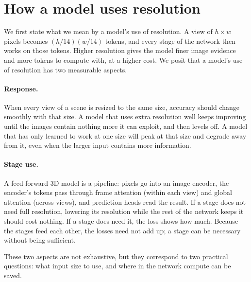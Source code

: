 \section{How a model uses resolution}
\label{sec:concept}

We first state what we mean by a model's use of resolution. A view of $h\times w$ pixels becomes $(h/14)(w/14)$ tokens, and every stage of the network then works on those tokens. Higher resolution gives the model finer image evidence and more tokens to compute with, at a higher cost. We posit that a model's use of resolution has two measurable aspects.

\paragraph{Response.} When every view of a scene is resized to the same size, accuracy should change smoothly with that size. A model that uses extra resolution well keeps improving until the images contain nothing more it can exploit, and then levels off. A model that has only learned to work at one size will peak at that size and degrade away from it, even when the larger input contains more information.

\paragraph{Stage use.} A feed-forward 3D model is a pipeline: pixels go into an image encoder, the encoder's tokens pass through frame attention (within each view) and global attention (across views), and prediction heads read the result. If a stage does not need full resolution, lowering its resolution while the rest of the network keeps it should cost nothing. If a stage does need it, the loss shows how much. Because the stages feed each other, the losses need not add up; a stage can be necessary without being sufficient.

These two aspects are not exhaustive, but they correspond to two practical questions: what input size to use, and where in the network compute can be saved.
